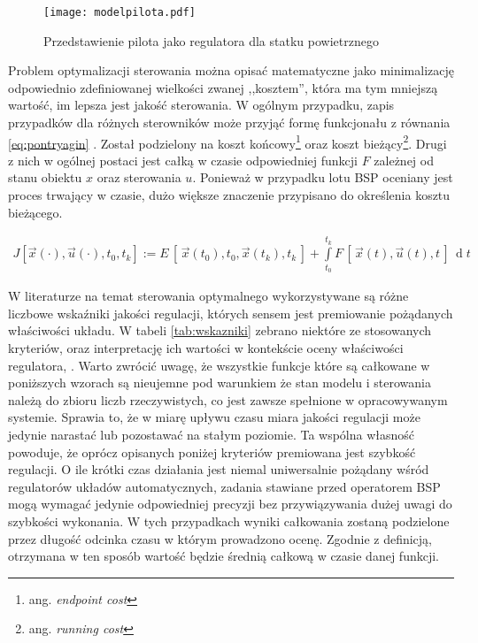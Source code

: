 \begin{figure}[!h]
    \caption{Przedstawienie pilota jako regulatora dla statku powietrznego}
    \label{fig:modelpilota}
    \centering \texttt{[image: modelpilota.pdf]}
\end{figure}

Problem optymalizacji sterowania można opisać matematyczne jako minimalizację odpowiednio zdefiniowanej wielkości zwanej ,,kosztem'', która ma tym mniejszą wartość, im lepsza jest jakość sterowania. W ogólnym przypadku, zapis przypadków dla różnych sterowników może przyjąć formę funkcjonału z równania \ref{eq:pontryagin} \cite{ross2009}. Został podzielony na koszt końcowy\footnote{ang. \emph{endpoint cost}} oraz koszt bieżący\footnote{ang. \emph{running cost}}. Drugi z nich w ogólnej postaci jest całką w czasie odpowiedniej funkcji $ F $ zależnej od stanu obiektu $ x $ oraz sterowania $ u $. Ponieważ w przypadku lotu BSP oceniany jest proces trwający w czasie, dużo większe znaczenie przypisano do określenia kosztu bieżącego.

\begin{align}
    \label{eq:pontryagin}
    J[\vec{x}(\cdot), \vec{u}(\cdot), t_0, t_k] :=E\,[\,\vec{x}(t_0),t_0,\vec{x}(t_k),t_k\,] + \int\limits_{t_0}^{t_k} F\,[\,\vec{x}(t),\vec{u}(t),t\,] \,\operatorname{d}t
\end{align}

W literaturze na temat sterowania optymalnego wykorzystywane są różne liczbowe wskaźniki jakości regulacji, których sensem jest premiowanie pożądanych właściwości układu. W tabeli \ref{tab:wskazniki} zebrano niektóre ze stosowanych kryteriów, oraz interpretację ich wartości w kontekście oceny właściwości regulatora\cite{tan2004}, \cite{kaczorek2015}. Warto zwrócić uwagę, że wszystkie funkcje które są całkowane w poniższych wzorach są nieujemne pod warunkiem że stan modelu i sterowania należą do zbioru liczb rzeczywistych, co jest zawsze spełnione w opracowywanym systemie. Sprawia to, że w miarę upływu czasu miara jakości regulacji może jedynie narastać lub pozostawać na stałym poziomie. Ta wspólna własność powoduje, że oprócz opisanych poniżej kryteriów premiowana jest szybkość regulacji. O ile krótki czas działania jest niemal uniwersalnie pożądany wśród regulatorów układów automatycznych, zadania stawiane przed operatorem BSP mogą wymagać jedynie odpowiedniej precyzji bez przywiązywania dużej uwagi do szybkości wykonania. W tych przypadkach wyniki całkowania zostaną podzielone przez długość odcinka czasu w którym prowadzono ocenę. Zgodnie z definicją, otrzymana w ten sposób wartość będzie średnią całkową w czasie danej funkcji.

